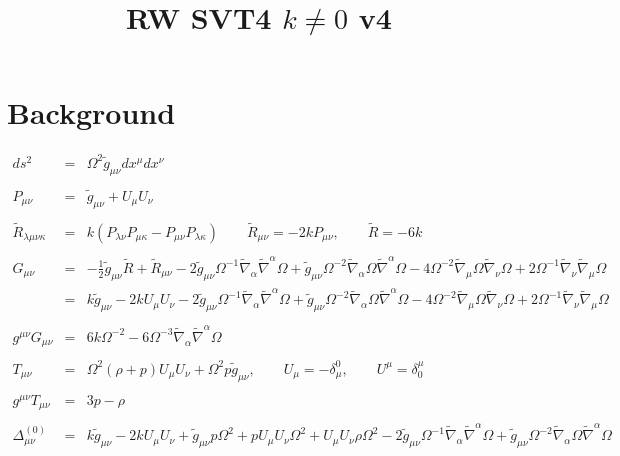 \documentclass[10pt,letterpaper]{article}
\title{RW SVT4 $k\ne 0$ v4}
\date{}
\numberwithin{equation}{section}
\begin{document}
 
\maketitle
\noindent 
\section{Background}

\begin{eqnarray}
ds^2 &=& \Omega^2\tilde g_{\mu\nu} dx^\mu dx^\nu
\label{geom}
\\ \nonumber\\
P_{\mu\nu} &=& \tilde g_{\mu\nu}+U_{\mu}U_\nu
\\ \nonumber\\
\tilde R_{\lambda\mu\nu\kappa} &=& k (P_{\lambda\nu}P_{\mu\kappa}-P_{\mu\nu}P_{\lambda\kappa})
\qquad
\tilde R_{\mu\nu} = -2k P_{\mu\nu},\qquad \tilde R= -6k 
\label{Ricci}
\\ \nonumber\\
G_{\mu\nu}&=& - \tfrac{1}{2} \tilde{g}_{\mu \nu } \tilde R + \tilde R_{\mu \nu } - 2 \tilde{g}_{\mu \nu } \Omega^{-1} \tilde{\nabla}_{\alpha }\tilde{\nabla}^{\alpha }\Omega + \tilde{g}_{\mu \nu } \Omega^{-2} \tilde{\nabla}_{\alpha }\Omega \tilde{\nabla}^{\alpha }\Omega - 4 \Omega^{-2} \tilde{\nabla}_{\mu }\Omega \tilde{\nabla}_{\nu }\Omega + 2 \Omega^{-1} \tilde{\nabla}_{\nu }\tilde{\nabla}_{\mu }\Omega 
 \nonumber\\
&=& k \tilde{g}_{\mu \nu } - 2 k U_{\mu } U_{\nu } - 2 \tilde{g}_{\mu \nu } \Omega^{-1} \tilde{\nabla}_{\alpha }\tilde{\nabla}^{\alpha }\Omega + \tilde{g}_{\mu \nu } \Omega^{-2} \tilde{\nabla}_{\alpha }\Omega \tilde{\nabla}^{\alpha }\Omega - 4 \Omega^{-2} \tilde{\nabla}_{\mu }\Omega \tilde{\nabla}_{\nu }\Omega + 2 \Omega^{-1} \tilde{\nabla}_{\nu }\tilde{\nabla}_{\mu }\Omega 
\\ \nonumber\\
g^{\mu\nu}G_{\mu\nu} &=& 6 k \Omega^{-2} - 6 \Omega^{-3} \tilde{\nabla}_{\alpha }\tilde{\nabla}^{\alpha }\Omega 
\\ \nonumber\\
T_{\mu\nu} &=& \Omega^2(\rho+p)U_\mu U_\nu + \Omega^2 p\tilde g_{\mu\nu},\qquad U_\mu = -\delta^0_\mu,\qquad U^\mu = \delta^\mu_0
\\ \nonumber\\
g^{\mu\nu}T_{\mu\nu} &=& 3p-\rho
\\ \nonumber\\
\Delta_{\mu\nu}^{(0)}&=& k \tilde{g}_{\mu \nu } - 2 k U_{\mu } U_{\nu } + \tilde{g}_{\mu \nu } p \Omega^2 + p U_{\mu } U_{\nu } \Omega^2 + U_{\mu } U_{\nu } \rho \Omega^2 - 2 \tilde{g}_{\mu \nu } \Omega^{-1} \tilde{\nabla}_{\alpha }\tilde{\nabla}^{\alpha }\Omega + \tilde{g}_{\mu \nu } \Omega^{-2} \tilde{\nabla}_{\alpha }\Omega \tilde{\nabla}^{\alpha }\Omega \nonumber \\ 

\end{eqnarray}
\end{document}
